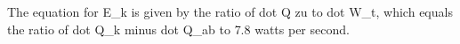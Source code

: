 The equation for E_k is given by the ratio of dot Q zu to dot W_t, which equals the ratio of dot Q_k minus dot Q_ab to 7.8 watts per second.